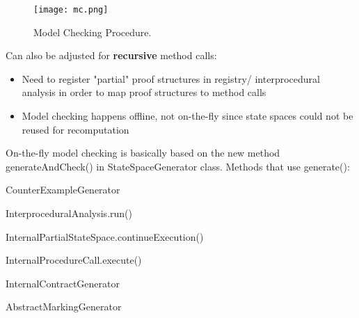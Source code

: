 \documentclass[a4paper,12pt]{article}
\newcommand{\cmark}{\ding{51}}%
\newcommand{\done}{\rlap{$\square$}{\raisebox{2pt}{\large\hspace{1pt}\cmark}}%
\hspace{-2.5pt}}
\begin{document}
\begin{figure}
	\texttt{[image: mc.png]}
	\caption{Model Checking Procedure.}
	\label{fig:mc}
\end{figure}

Can also be adjusted for \textbf{recursive} method calls:

\begin{itemize}
	\item Need to register "partial" proof structures in registry/ interprocedural analysis in order to map proof structures to method calls	
	\item Model checking happens offline, not on-the-fly since state spaces could not be reused for recomputation
\end{itemize}

On-the-fly model checking is basically based on the new method generateAndCheck() in StateSpaceGenerator class. Methods that use generate():

\begin{todolist}
	\item CounterExampleGenerator
	\item InterproceduralAnalysis.run()
	\item InternalPartialStateSpace.continueExecution()
	\item[\done] InternalProcedureCall.execute()
	\item InternalContractGenerator
	\item AbstractMarkingGenerator
\end{todolist}
\end{document}
